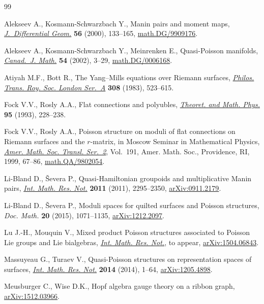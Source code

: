 \begin{thebibliography}{99}
\footnotesize\itemsep=0pt

Alekseev A., Kosmann-Schwarzbach Y., Manin pairs and moment maps,
 \href{https://doi.org/10.4310/jdg/1090347528}{\textit{J.~Differential Geom.}} \textbf{56} (2000), 133--165,
 \href{https://arxiv.org/abs/math.DG/9909176}{math.DG/9909176}.

Alekseev A., Kosmann-Schwarzbach Y., Meinrenken E., Quasi-{P}oisson manifolds,
 \href{https://doi.org/10.4153/CJM-2002-001-5}{\textit{Canad.~J. Math.}} \textbf{54} (2002), 3--29, \href{https://arxiv.org/abs/math.DG/0006168}{math.DG/0006168}.

Atiyah M.F., Bott R., The {Y}ang--{M}ills equations over {R}iemann surfaces,
 \href{https://doi.org/10.1098/rsta.1983.0017}{\textit{Philos. Trans. Roy. Soc. London Ser.~A}} \textbf{308} (1983),
 523--615.

Fock V.V., Rosly A.A., Flat connections and polyubles, \href{https://doi.org/10.1007/BF01017138}{\textit{Theoret. and
 Math. Phys.}} \textbf{95} (1993), 228--238.

Fock V.V., Rosly A.A., Poisson structure on moduli of f\/lat connections on
 {R}iemann surfaces and the {$r$}-mat\-rix, in Moscow {S}eminar in
 {M}athematical {P}hysics, \href{https://doi.org/10.1090/trans2/191/03}{\textit{Amer. Math. Soc. Transl. Ser.~2}}, Vol.~191,
 Amer. Math. Soc., Providence, RI, 1999, 67--86, \href{https://arxiv.org/abs/math.QA/9802054}{math.QA/9802054}.

Li-Bland D., \v{S}evera P., Quasi-{H}amiltonian groupoids and multiplicative
 {M}anin pairs, \href{https://doi.org/10.1093/imrn/rnq170}{\textit{Int. Math. Res. Not.}} \textbf{2011} (2011),
 2295--2350, \href{https://arxiv.org/abs/0911.2179}{arXiv:0911.2179}.

Li-Bland D., \v{S}evera P., Moduli spaces for quilted surfaces and {P}oisson
 structures, \textit{Doc. Math.} \textbf{20} (2015), 1071--1135,
 \href{https://arxiv.org/abs/1212.2097}{arXiv:1212.2097}.

Lu J.-H., Mouquin V., Mixed product Poisson structures associated to {P}oisson
 {L}ie groups and {L}ie bialgebras, \href{https://doi.org/10.1093/imrn/rnw189}{\textit{Int. Math. Res. Not.}}, {t}o appear,
 \href{https://arxiv.org/abs/1504.06843}{arXiv:1504.06843}.

Massuyeau G., Turaev V., Quasi-{P}oisson structures on representation spaces of
 surfaces, \href{https://doi.org/10.1093/imrn/rns215}{\textit{Int. Math. Res. Not.}} \textbf{2014} (2014), 1--64,
 \href{https://arxiv.org/abs/1205.4898}{arXiv:1205.4898}.

Meusburger C., Wise D.K., Hopf algebra gauge theory on a ribbon graph,
 \href{https://arxiv.org/abs/1512.03966}{arXiv:1512.03966}.

\end{thebibliography}
